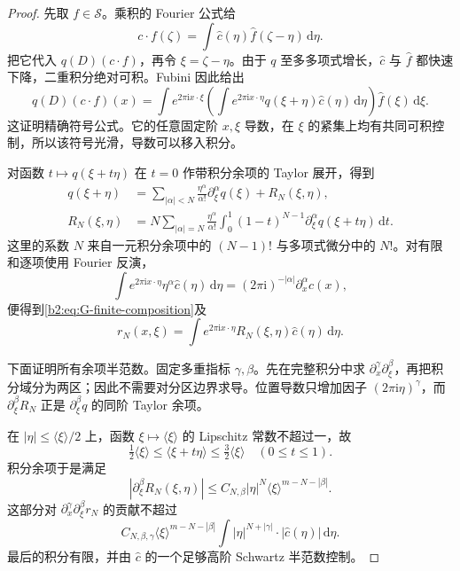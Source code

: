 \begin{proof}
先取 \(f\in\mathcal S\)。乘积的 Fourier 公式给
\[
 \widehat{c\cdot f}(\zeta)
 =\int\widehat c(\eta)\widehat f(\zeta-\eta)\,\mathrm d\eta.
\]
把它代入 \(q(D)(c\cdot f)\)，再令 \(\xi=\zeta-\eta\)。由于 \(q\) 至多多项式增长，\(\widehat c\) 与 \(\widehat f\) 都快速下降，二重积分绝对可积。Fubini 因此给出
\[
 q(D)(c\cdot f)(x)
 =\int e^{2\pi\mathrm ix\cdot\xi}
       \left(\int e^{2\pi\mathrm ix\cdot\eta}
             q(\xi+\eta)\widehat c(\eta)\,\mathrm d\eta\right)
       \widehat f(\xi)\,\mathrm d\xi.
\]
这证明精确符号公式。它的任意固定阶 \(x,\xi\) 导数，在 \(\xi\) 的紧集上均有共同可积控制，所以该符号光滑，导数可以移入积分。

对函数 \(t\mapsto q(\xi+t\eta)\) 在 \(t=0\) 作带积分余项的 Taylor 展开，得到
\[
 \begin{split}
 q(\xi+\eta)
 &=\sum_{|\alpha|<N}
       \frac{\eta^\alpha}{\alpha!}\partial_\xi^\alpha q(\xi)
       +R_N(\xi,\eta),\\
 R_N(\xi,\eta)
 &=N\sum_{|\alpha|=N}\frac{\eta^\alpha}{\alpha!}
       \int_0^1(1-t)^{N-1}
            \partial_\xi^\alpha q(\xi+t\eta)\,\mathrm dt.
 \end{split}
\]
这里的系数 \(N\) 来自一元积分余项中的 \((N-1)!\) 与多项式微分中的 \(N!\)。对有限和逐项使用 Fourier 反演，
\[
 \int e^{2\pi\mathrm ix\cdot\eta}\eta^\alpha
                   \widehat c(\eta)\,\mathrm d\eta
 =(2\pi\mathrm i)^{-|\alpha|}\partial_x^\alpha c(x),
\]
便得到\eqref{b2:eq:G-finite-composition}及
\[
 r_N(x,\xi)=\int e^{2\pi\mathrm ix\cdot\eta}
                    R_N(\xi,\eta)\widehat c(\eta)\,\mathrm d\eta.
\]

下面证明所有余项半范数。固定多重指标 \(\gamma,\beta\)。先在完整积分中求 \(\partial_x^\gamma\partial_\xi^\beta\)，再把积分域分为两区；因此不需要对分区边界求导。位置导数只增加因子 \((2\pi\mathrm i\eta)^\gamma\)，而 \(\partial_\xi^\beta R_N\) 正是 \(\partial_\xi^\beta q\) 的同阶 Taylor 余项。

在 \(|\eta|\le\langle\xi\rangle/2\) 上，函数 \(\xi\mapsto\langle\xi\rangle\) 的 Lipschitz 常数不超过一，故
\[
 \tfrac12\langle\xi\rangle
 \le\langle\xi+t\eta\rangle
 \le\tfrac32\langle\xi\rangle
 \quad(0\le t\le1).
\]
积分余项于是满足
\[
 |\partial_\xi^\beta R_N(\xi,\eta)|
 \le C_{N,\beta}|\eta|^N
                   \langle\xi\rangle^{m-N-|\beta|}.
\]
这部分对 \(\partial_x^\gamma\partial_\xi^\beta r_N\) 的贡献不超过
\[
 C_{N,\beta,\gamma}\langle\xi\rangle^{m-N-|\beta|}
       \int |\eta|^{N+|\gamma|}\cdot|\widehat c(\eta)|\,\mathrm d\eta.
\]
最后的积分有限，并由 \(\widehat c\) 的一个足够高阶 Schwartz 半范数控制。


\end{proof}
